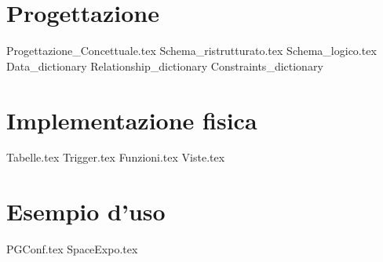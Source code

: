 \documentclass[a4paper,oneside, 11pt]{book}
\begin{document}
\chapter{Progettazione}
{Progettazione_Concettuale.tex}
{Schema_ristrutturato.tex}
{Schema_logico.tex}
{Data_dictionary}
{Relationship_dictionary}
{Constraints_dictionary}
\chapter{Implementazione fisica}
{Tabelle.tex}
{Trigger.tex}
{Funzioni.tex}
{Viste.tex}
\chapter{Esempio d'uso}
{PGConf.tex}
{SpaceExpo.tex}
\end{document}
